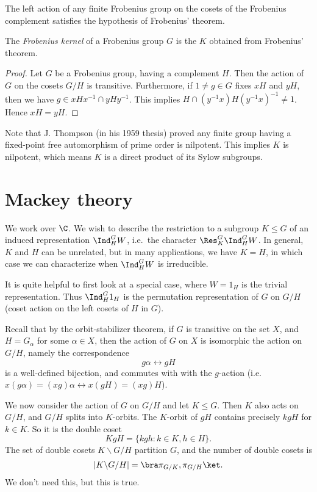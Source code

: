 \documentclass[a4paper]{article}
\begin{document}
\begin{prop}
  The left action of any finite Frobenius group on the cosets of the Frobenius complement satisfies the hypothesis of Frobenius' theorem.
\end{prop}

\begin{defi}
  The \emph{Frobenius kernel} of a Frobenius group $G$ is the $K$ obtained from Frobenius' theorem.
\end{defi}

\begin{proof}
  Let $G$ be a Frobenius group, having a complement $H$. Then the action of $G$ on the cosets $G/H$ is transitive. Furthermore, if $1 \not= g\in G$ fixes $xH$ and $yH$, then we have $g \in xHx^{-1} \cap yHy^{-1}$. This implies $H \cap (y^{-1}x) H (y^{-1}x)^{-1} \not= 1$. Hence $xH = yH$.
\end{proof}

Note that J. Thompson (in his 1959 thesis) proved any finite group having a fixed-point free automorphism of prime order is nilpotent. This implies $K$ is nilpotent, which means $K$ is a direct product of its Sylow subgroups.

\section{Mackey theory}
We work over $\C$. We wish to describe the restriction to a subgroup $K\leq G$ of an induced representation $\Ind_H^G W$, i.e.\ the character $\Res_K^G \Ind_H^G W$. In general, $K$ and $H$ can be unrelated, but in many applications, we have $K = H$, in which case we can characterize when $\Ind_H^G W$ is irreducible.

It is quite helpful to first look at a special case, where $W = 1_H$ is the trivial representation. Thus $\Ind_H^G 1_H$ is the permutation representation of $G$ on $G/H$ (coset action on the left cosets of $H$ in $G$).

Recall that by the orbit-stabilizer theorem, if $G$ is transitive on the set $X$, and $H = G_\alpha$ for some $\alpha \in X$, then the action of $G$ on $X$ is isomorphic the action on $G/H$, namely the correspondence
\[
  g\alpha \leftrightarrow gH
\]
is a well-defined bijection, and commutes with with the $g$-action (i.e.\ $x (g\alpha) = (xg)\alpha \leftrightarrow x(gH) = (xg)H$).

We now consider the action of $G$ on $G/H$ and let $K \leq G$. Then $K$ also acts on $G/H$, and $G/H$ splits into $K$-orbits. The $K$-orbit of $gH$ contains precisely $kgH$ for $k \in K$. So it is the double coset
\[
  KgH = \{kgh: k \in K, h \in H\}.
\]
The set of double cosets $K \backslash G/H$ partition $G$, and the number of double cosets is
\[
  |K \backslash G/H| = \bra \pi_{G/K}, \pi_{G/H}\ket.
\]
We don't need this, but this is true.
\end{document}
